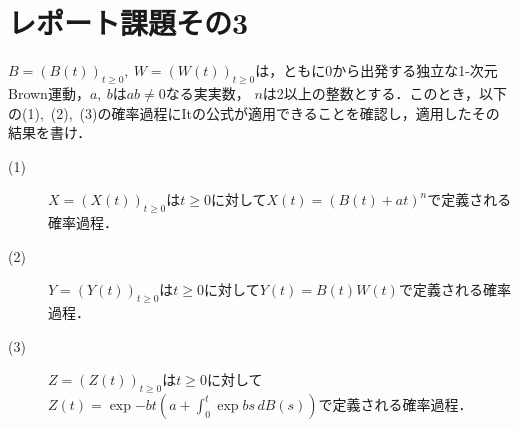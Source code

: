 \section{レポート課題その3}
$B=(B(t))_{t \geq 0},\ W = (W(t))_{t \geq 0}$は，ともに0から出発する独立な1-次元Brown運動，$a,\ b$は$ab \neq 0$なる実実数，
$n$は2以上の整数とする．このとき，以下の(1),\ (2),\ (3)の確率過程にItの公式が適用できることを確認し，適用したその結果を書け．
\begin{description}
	\item[(1)] $X = (X(t))_{t \geq 0}$は$t \geq 0$に対して$X(t) = \left(B(t) + at\right)^n$で定義される確率過程．
	\item[(2)] $Y = (Y(t))_{t \geq 0}$は$t \geq 0$に対して$Y(t) = B(t)W(t)$で定義される確率過程．
	\item[(3)] $Z = (Z(t))_{t \geq 0}$は$t \geq 0$に対して$Z(t) = \exp{-bt} \left(a + \int_{0}^{t} \exp{bs}\, dB(s) \right)$で定義される確率過程．
\end{description}


